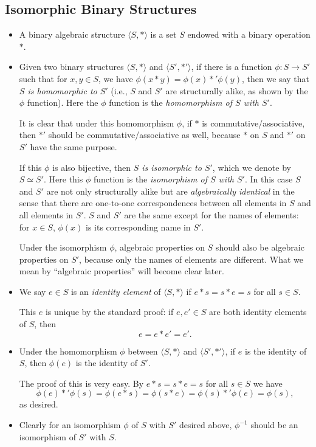 \documentclass[11pt]{article}
\newcommand{\df}[1]{\textit{\textsf{#1}}}
\newcommand{\la}{\langle}
\newcommand{\ra}{\rangle}
\begin{document}
\subsection{Isomorphic Binary Structures}
\begin{itemize}
    \item A binary algebraic structure $\la S,\ast \ra$ is a set $S$ endowed with a binary operation $\ast$.
    \item Given two binary structures $\la S,\ast \ra$ and $\la S',\ast' \ra$, if there is a function $\phi: S \to S'$ such that for $x,y \in S$, we have $\phi(x \ast y) = \phi(x) \ast' \phi(y)$, then we say that \df{$S$ is homomorphic to $S'$} (i.e., $S$ and $S'$ are structurally alike, as shown by the $\phi$ function). Here the $\phi$ function is the \df{homomorphism of $S$ with $S'$}.

    It is clear that under this homomorphism $\phi$, if $\ast$ is commutative/associative, then $\ast'$ should be commutative/associative as well, because $\ast$ on $S$ and $\ast'$ on $S'$ have the same purpose.
    
    If this $\phi$ is also bijective, then \df{$S$ is isomorphic to $S'$}, which we denote by $S \simeq S'$. Here this $\phi$ function is the \df{isomorphism of $S$ with $S'$}. In this case $S$ and $S'$ are not only structurally alike but are \emph{algebraically identical} in the sense that there are one-to-one correspondences between all elements in $S$ and all elements in $S'$. $S$ and $S'$ are the same except for the names of elements: for $x \in S$, $\phi(x)$ is its corresponding name in $S'$.

    Under the isomorphism $\phi$, algebraic properties on $S$ should also be algebraic properties on $S'$, because only the names of elements are different. What we mean by ``algebraic properties'' will become clear later.
    \item We say $e \in S$ is an \df{identity element} of $\la S,\ast \ra$ if $e \ast s = s \ast e = s$ for all $s \in S$.
    
    This $e$ is unique by the standard proof: if $e,e' \in S$ are both identity elements of $S$, then \[e = e \ast e' = e'.\]
    \item Under the homomorphism $\phi$ between $\la S,\ast \ra$ and $\la S',\ast' \ra$, if $e$ is the identity of $S$, then $\phi(e)$ is the identity of $S'$.

    The proof of this is very easy. By $e \ast s = s \ast e = s$ for all $s \in S$ we have \[\phi(e) \ast' \phi(s) = \phi(e \ast s) = \phi (s \ast e) = \phi(s) \ast' \phi(e) = \phi(s),\] as desired.
    \item Clearly for an isomorphism $\phi$ of $S$ with $S'$ desired above, $\phi^{-1}$ should be an isomorphism of $S'$ with $S$.
    

\end{itemize}
\end{document}
